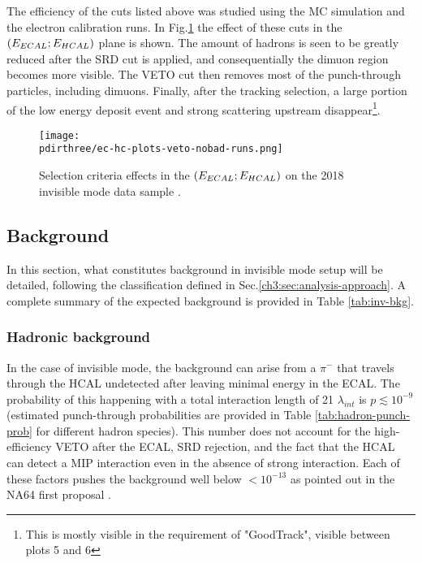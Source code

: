 The efficiency of the cuts listed above was studied using the MC simulation and the electron calibration runs.
In Fig.\ref{fig:inv-cut-ehcal} the effect of these cuts in the $(E_{ECAL};E_{HCAL})$ plane is shown.
The amount of hadrons is seen to be greatly reduced after the SRD cut is applied, and consequentially the dimuon region becomes more visible. The VETO cut then removes most of the punch-through particles, including dimuons. Finally, after the tracking selection, a large portion of the low energy deposit event and strong scattering upstream disappear\footnote{This is mostly visible in the requirement of "GoodTrack", visible between plots 5 and 6}.


\begin{figure}[bth!]
  \centering
   \texttt{[image: \\pdirthree/ec-hc-plots-veto-nobad-runs.png]}
  \caption[Effect of the cuts in invisible mode]{Selection criteria effects in the $(E_{ECAL};E_{HCAL})$ on the 2018 invisible mode data sample \cite{invis-cut-plot,NA64:2019imj}.}
  \label{fig:inv-cut-ehcal}
\end{figure}

\subsection{Background}
\label{ch3:sec:bkg:inv}

In this section, what constitutes background in invisible mode setup will be detailed, following the classification defined in Sec.\ref{ch3:sec:analysis-approach}. A complete summary of the expected background is provided in Table \ref{tab:inv-bkg}.
\subsubsection{Hadronic background}
\label{ch3:sec:bkg:inv:hadr}


In the case of invisible mode, the background can arise from a $\pi^-$ that travels through the HCAL undetected after leaving minimal energy in the ECAL. The probability of this happening with a total interaction length of 21 $\lambda_{int}$ is $p\lesssim 10^{-9}$ (estimated punch-through probabilities are provided in Table \ref{tab:hadron-punch-prob} for different hadron species). This number does not account for the high-efficiency VETO after the ECAL, SRD rejection, and the fact that the HCAL can detect a MIP interaction even in the absence of strong interaction. Each of these factors pushes the background well below $<10^{-13}$ as pointed out in the NA64 first proposal \cite{Andreas:2013lya}.

